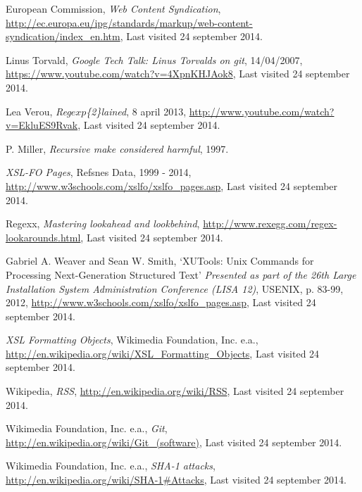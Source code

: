 \renewcommand{\bibname}{References}

\begin{thebibliography}{90}

  
    European Commission, 
    \emph{Web Content Syndication},
    \url{http://ec.europa.eu/ipg/standards/markup/web-content-syndication/index\_en.htm}, 
    Last visited 24 september 2014.

    Linus Torvald,
    \emph{Google Tech Talk: Linus Torvalds on git},
    14/04/2007,
	\url{https://www.youtube.com/watch?v=4XpnKHJAok8},
	Last visited 24 september 2014.

	Lea Verou,
	\emph{Reg\(exp\)\{2\}lained},
	8 april 2013,
	\url{http://www.youtube.com/watch?v=EkluES9Rvak},
	Last visited 24 september 2014.

  P. Miller,
  \emph{Recursive make considered harmful},
  1997.

  \emph{XSL-FO Pages},
  Refsnes Data,
  1999 - 2014,
  \url{http://www.w3schools.com/xslfo/xslfo\_pages.asp},
  Last visited 24 september 2014.

    Regexx,
    \emph{Mastering lookahead and lookbehind},
	\url{http://www.rexegg.com/regex-lookarounds.html}, 
	Last visited 24 september 2014.

  Gabriel A. Weaver and Sean W. Smith,
  `XUTools: Unix Commands for Processing Next-Generation Structured Text'
  \emph{Presented as part of the 26th Large Installation System Administration Conference (LISA 12)},
  USENIX,
  p. 83-99,
  2012,
  \url{http://www.w3schools.com/xslfo/xslfo\_pages.asp},
  Last visited 24 september 2014.

  \emph{XSL Formatting Objects},
  Wikimedia Foundation, Inc. e.a., 
  \url{http://en.wikipedia.org/wiki/XSL\_Formatting\_Objects},
  Last visited 24 september 2014.

    Wikipedia,
    \emph{RSS},
    \url{http://en.wikipedia.org/wiki/RSS}, 
    Last visited 24 september 2014.
	
    Wikimedia Foundation, Inc. e.a., 
    \emph{Git},
    \url{http://en.wikipedia.org/wiki/Git\_(software)}, 
    Last visited 24 september 2014.
    
    Wikimedia Foundation, Inc. e.a.,
    \emph{SHA-1 attacks},
    \url{http://en.wikipedia.org/wiki/SHA-1#Attacks},
    Last visited 24 september 2014.

\end{thebibliography}
